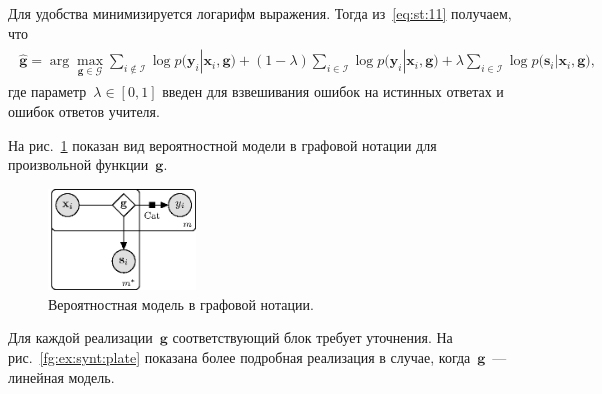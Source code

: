 Для удобства минимизируется логарифм выражения. Тогда из~\eqref{eq:st:11} получаем, что
\begin{gather}
\label{eq:st:12}
\begin{aligned}
\hat{\mathbf{g}} = \arg\max_{\mathbf{g}\in \mathcal{G}} \sum_{i\not\in \mathcal{I}}\log p\bigr(\mathbf{y}_i|\mathbf{x}_i, \mathbf{g}\bigr) + \left(1-\lambda\right)\sum_{i\in \mathcal{I}}\log p\bigr(\mathbf{y}_i|\mathbf{x}_i, \mathbf{g}\bigr) + \lambda\sum_{i\in \mathcal{I}}\log p\bigr(\mathbf{s}_i|\mathbf{x}_i, \mathbf{g}\bigr),
\end{aligned}
\end{gather}
где параметр~$\lambda \in [0,1]$ введен для взвешивания ошибок на истинных ответах и ошибок ответов учителя.

На рис.~\ref{fg:st:plate} показан вид вероятностной модели в графовой нотации для произвольной функции~$\mathbf{g}$.

\begin{figure}[h!]\center
\includegraphics[width=0.35\textwidth]{results/privlearn/general_model}
\caption{Вероятностная модель в графовой нотации.}
\label{fg:st:plate}
\end{figure}

Для каждой реализации~$\mathbf{g}$ соответствующий блок требует уточнения. На рис.~\ref{fg:ex:synt:plate} показана более подробная реализация в случае, когда~$\mathbf{g}$~--- линейная модель.

